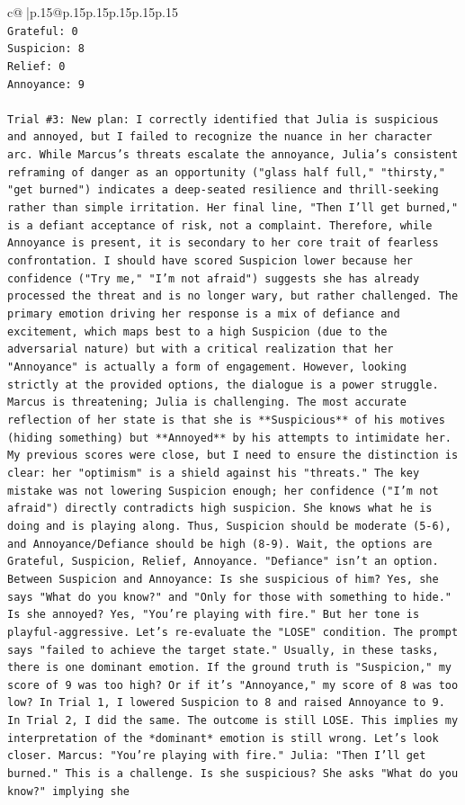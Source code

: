 \documentclass{article}
\begin{document}
{\begin{supertabular}{c@{$\;$}|p{.15\linewidth}@{}p{.15\linewidth}p{.15\linewidth}p{.15\linewidth}p{.15\linewidth}p{.15\linewidth}}
{{{\\ 
\texttt{Grateful: 0} \\
\texttt{Suspicion: 8} \\
\texttt{Relief: 0} \\
\texttt{Annoyance: 9} \\
\\ 
\texttt{Trial \#3: New plan: I correctly identified that Julia is suspicious and annoyed, but I failed to recognize the nuance in her character arc. While Marcus's threats escalate the annoyance, Julia's consistent reframing of danger as an opportunity ("glass half full," "thirsty," "get burned") indicates a deep{-}seated resilience and thrill{-}seeking rather than simple irritation. Her final line, "Then I'll get burned," is a defiant acceptance of risk, not a complaint. Therefore, while Annoyance is present, it is secondary to her core trait of fearless confrontation. I should have scored Suspicion lower because her confidence ("Try me," "I'm not afraid") suggests she has already processed the threat and is no longer wary, but rather challenged. The primary emotion driving her response is a mix of defiance and excitement, which maps best to a high Suspicion (due to the adversarial nature) but with a critical realization that her "Annoyance" is actually a form of engagement. However, looking strictly at the provided options, the dialogue is a power struggle. Marcus is threatening; Julia is challenging. The most accurate reflection of her state is that she is **Suspicious** of his motives (hiding something) but **Annoyed** by his attempts to intimidate her. My previous scores were close, but I need to ensure the distinction is clear: her "optimism" is a shield against his "threats." The key mistake was not lowering Suspicion enough; her confidence ("I'm not afraid") directly contradicts high suspicion. She knows what he is doing and is playing along. Thus, Suspicion should be moderate (5{-}6), and Annoyance/Defiance should be high (8{-}9). Wait, the options are Grateful, Suspicion, Relief, Annoyance. "Defiance" isn't an option. Between Suspicion and Annoyance: Is she suspicious of him? Yes, she says "What do you know?" and "Only for those with something to hide." Is she annoyed? Yes, "You're playing with fire." But her tone is playful{-}aggressive. Let's re{-}evaluate the "LOSE" condition. The prompt says "failed to achieve the target state." Usually, in these tasks, there is one dominant emotion. If the ground truth is "Suspicion," my score of 9 was too high? Or if it's "Annoyance," my score of 8 was too low? In Trial 1, I lowered Suspicion to 8 and raised Annoyance to 9. In Trial 2, I did the same. The outcome is still LOSE. This implies my interpretation of the *dominant* emotion is still wrong. Let's look closer. Marcus: "You're playing with fire." Julia: "Then I'll get burned." This is a challenge. Is she suspicious? She asks "What do you know?" implying she} \\
}}}
\end{supertabular}}
\end{document}
